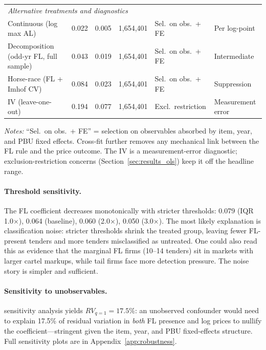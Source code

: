 \begin{table}[htbp]
\begin{tabular}{lcccll}
\hline
\multicolumn{6}{l}{\textit{Alternative treatments and diagnostics}} \\
Continuous (log max AL) & 0.022 & 0.005 & 1{,}654{,}401 & Sel.\ on obs.\ + FE & Per log-point \\
Decomposition (odd-yr FL, full sample) & 0.043 & 0.019 & 1{,}654{,}401 & Sel.\ on obs.\ + FE & Intermediate \\
Horse-race (FL + Imhof CV) & 0.084 & 0.023 & 1{,}654{,}401 & Sel.\ on obs.\ + FE & Suppression \\
IV (leave-one-out) & 0.194 & 0.077 & 1{,}654{,}401 & Excl.\ restriction & Measurement error \\
\hline\hline
\end{tabular}
\begin{tablenotes}
\small
\item \textit{Notes:} ``Sel.\ on obs.\ + FE'' = selection on observables absorbed by item, year, and PBU fixed effects. Cross-fit further removes any mechanical link between the FL rule and the price outcome. The IV is a measurement-error diagnostic; exclusion-restriction concerns (Section~\ref{sec:results_ols}) keep it off the headline range.
\end{tablenotes}
\end{table}


\paragraph{Threshold sensitivity.}
The FL coefficient decreases monotonically with stricter thresholds:
0.079 (IQR 1.0$\times$), 0.064 (baseline), 0.060 (2.0$\times$),
0.050 (3.0$\times$). The most likely explanation is classification noise: stricter
thresholds shrink the treated group, leaving fewer FL-present tenders
and more tenders misclassified as untreated. One could also read this
as evidence that the marginal FL firms (10--14 tenders) sit in markets
with larger cartel markups, while tail firms face more detection
pressure. The noise story is simpler and sufficient.

\paragraph{Sensitivity to unobservables.}
\citet{cinelli2020making} sensitivity analysis yields $RV_{q=1} =
17.5\%$: an unobserved confounder would need to explain 17.5\% of
residual variation in \emph{both} FL presence and log prices to nullify
the coefficient---stringent given the item, year, and PBU fixed-effects
structure. Full sensitivity plots are in
Appendix~\ref{app:robustness}.


